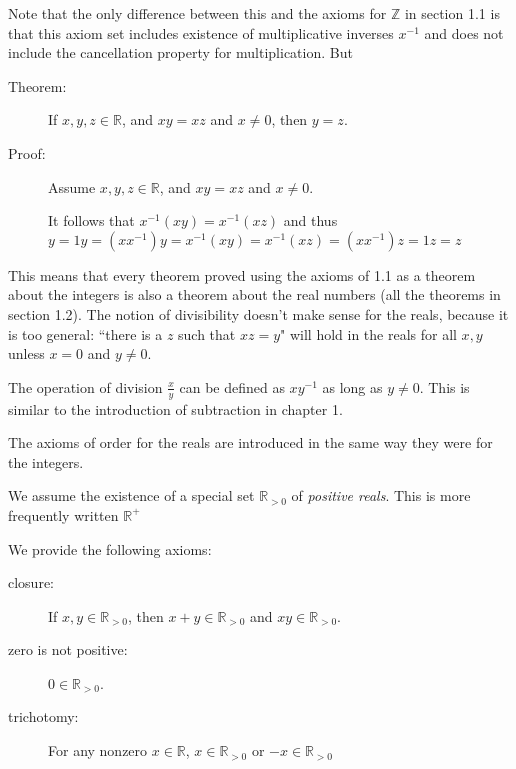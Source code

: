 \documentclass[12pt]{article}
\begin{document}
Note that the only difference between this and the axioms for $\mathbb Z$ in section 1.1 is that this axiom set includes existence of multiplicative inverses $x^{-1}$ and does not include the cancellation property for multiplication.  But

\begin{description}

\item[Theorem:]  If $x,y,z \in \mathbb R$, and $xy = xz$ and $x \neq 0$, then $y=z$.

\item[Proof:]  Assume $x,y,z \in \mathbb R$, and $xy = xz$ and $x \neq 0$.

It follows that $x^{-1}(xy) = x^{-1}(xz)$ and thus $y = 1y = (xx^{-1})y = x^{-1}(xy) = x^{-1}(xz) = (xx^{-1})z = 1z = z$

\end{description}

This means that every theorem proved using the axioms of 1.1 as a theorem about the integers is also a theorem about the real numbers (all the theorems in section 1.2).  The notion of divisibility doesn't make sense for the reals, because it is too general:  ``there is a $z$ such that $xz=y$"  will hold in the reals for all $x,y$ unless $x = 0$ and $y \neq 0$.

The operation of division $\frac xy$ can be defined as $xy^{-1}$ as long as $y \neq 0$.  This is similar to the introduction of subtraction in chapter 1.

The axioms of order for the reals are introduced in the same way they were for the integers.

We assume the existence of a special set $\mathbb R_{>0}$ of {\em positive reals\/}.  This is more frequently written ${\mathbb R}^+$

We provide the following axioms:

\begin{description}

\item[closure:]  If $x,y \in \mathbb R_{>0}$, then $x+y \in \mathbb R_{>0}$ and $xy \in \mathbb R_{>0}$.

\item[zero is not positive:]  $0 \in \mathbb R_{>0}$.

\item[trichotomy:]  For any nonzero $x \in \mathbb R$, $x \in {\mathbb R}_{>0}$  or $-x \in {\mathbb R}_{>0}$

\end{description}
\end{document}
